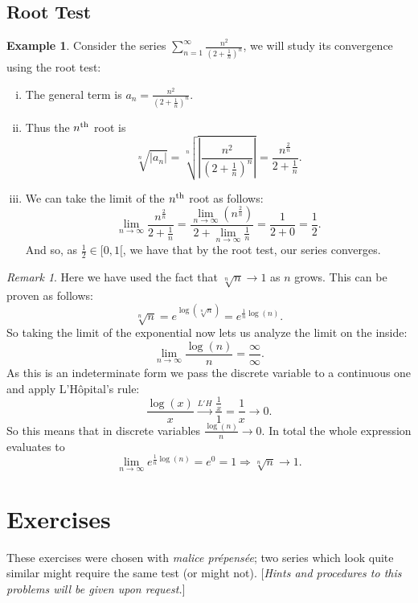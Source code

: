 \documentclass[12pt]{article}
\theoremstyle{plain}
\theoremstyle{definition}
\newtheorem{Ex}[Th]{Example}           %
\theoremstyle{remark}
\newtheorem*{Rmk}{Remark}      %
\renewcommand{\:}{\colon}           %
\newcommand{\half}{\frac12}
\renewcommand{\.}{\Cdot}                %
\newcommand{\To}{\Rightarrow}
\begin{document}
\begin{multicols}{2}
\subsection*{Root Test}
\begin{Ex} 
Consider the series $\displaystyle\sum_{n=1}^\infty \frac{n^2}{\left(2+\frac{1}{n}\right)^n}$, we will study its convergence using the root test:
\begin{enumerate}[i)]
  \itemsep=-0.4em 
  \item The general term is $a_n=\frac{n^2}{\left(2+\frac{1}{n}\right)^n}$.
  \item Thus the $n\textsuperscript{th}$ root is 
  $$\sqrt[n]{|a_n|}=\sqrt[n]{\left|\frac{n^2}{\left(2+\frac{1}{n}\right)^n}\right|}=\frac{n^{\frac{2}{n}}}{2+\frac{1}{n}}.$$
  \item We can take the limit of the $n\textsuperscript{th}$ root as follows:
  $$\lim_{n\to\infty}\frac{n^{\frac{2}{n}}}{2+\frac{1}{n}}=\frac{\lim_{n\to\infty} (n^{\frac{2}{n}})}{2+\lim_{n\to\infty}\frac{1}{n}}=\frac{1}{2+0}=\frac12.$$
  And so, as $\half\in[0,1[$, we have that by the root test, our series converges. 
\end{enumerate}
\end{Ex}
\begin{Rmk}
Here we have used the fact that $\sqrt[n]{n}\to 1$ as $n$ grows. This can be proven as follows:
$$\sqrt[n]{n}=e^{\log(\sqrt[n]{n})}=e^{\frac{1}{n}\log(n)}.$$
So taking the limit of the exponential now lets us analyze the limit on the inside:
$$\lim_{n\to\infty}\frac{\log(n)}{n}=\frac{\infty}{\infty}.$$
As this is an indeterminate form we pass the discrete variable to a continuous one and apply L'Hôpital's rule: 
$$\frac{\log(x)}{x}\xrightarrow[]{L'H}\frac{\frac{1}{x}}{1}=\frac{1}{x}\to 0.$$
So this means that in discrete variables $\frac{\log(n)}{n}\to0$. In total the whole expression evaluates to 
$$\lim_{n\to\infty}e^{\frac{1}{n}\log(n)}=e^0=1\To \sqrt[n]{n}\to 1.$$
\end{Rmk}
\newpage
\section*{Exercises}

These exercises were chosen with \emph{malice prépensée}; two series which look quite similar might require the same test (or might not). [\emph{Hints and procedures to this problems will be given upon request.}]\par 


\end{multicols}
\end{document}
